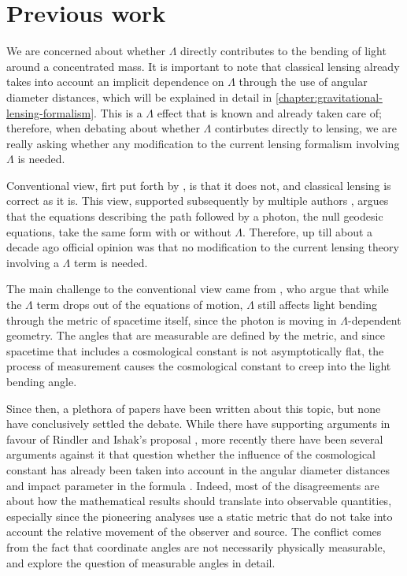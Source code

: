 \section{Previous work}

We are concerned about whether $\Lambda$ directly contributes to the bending of light around a concentrated mass. It is important to note that classical lensing already takes into account an implicit dependence on $\Lambda$ through the use of angular diameter distances, which will be explained in detail in \autoref{chapter:gravitational-lensing-formalism}. This is a $\Lambda$ effect that is known and already taken care of; therefore, when debating about whether $\Lambda$ contirbutes directly to lensing, we are really asking whether any modification to the current lensing formalism involving $\Lambda$ is needed. 

Conventional view, firt put forth by \citet{islam1983cosmological}, is that it does not, and classical lensing is correct as it is. This view, supported subsequently by multiple authors \citep{lake2002bending,park2008rigorous,simpson2010lensing,khriplovich2008does}, argues that the equations describing the path followed by a photon, the null geodesic equations, take the same form with or without $\Lambda$. Therefore, up till about a decade ago official opinion was that no modification to the current lensing theory involving a $\Lambda$ term is needed. 

The main challenge to the conventional view came from \citet{rindler2007contribution}, who argue that while the $\Lambda$ term drops out of the equations of motion, $\Lambda$ still affects light bending through the metric of spacetime itself, since the photon is moving in $\Lambda$-dependent geometry. The angles that are measurable are defined by the metric, and since spacetime that includes a cosmological constant is not asymptotically flat, the process of measurement causes the cosmological constant to creep into the light bending angle. 

Since then, a plethora of papers have been written about this topic, but none have conclusively settled the debate. While there have supporting arguments in favour of Rindler and Ishak's proposal \citep{sereno2008influence,bhadra2010gravitational,schucker2008strong}, more recently there have been several arguments against it that question whether the influence of the cosmological constant has already been taken into account in the angular diameter distances and impact parameter in the formula \citep{butcher2016no,piattella2016lensing,arakida2012effect}. Indeed, most of the disagreements are about how the mathematical results should translate into observable quantities, especially since the pioneering analyses use a static metric that do not take into account the relative movement of the observer and source. The conflict comes from the fact that coordinate angles are not necessarily physically measurable, and \citet{lebedev2013influence} explore the question of measurable angles in detail. 

